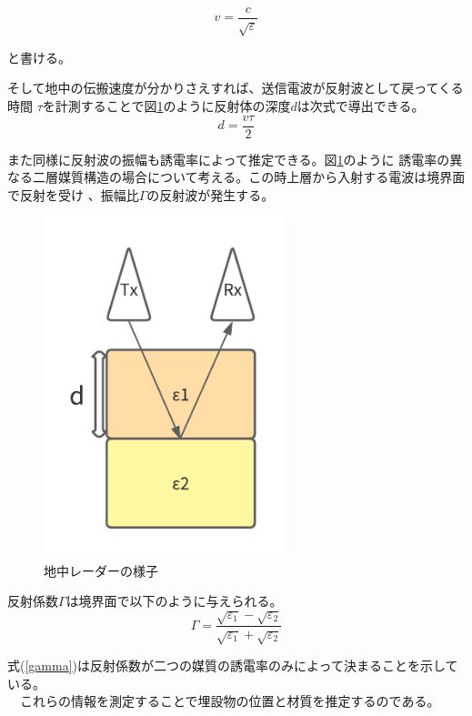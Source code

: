 \documentclass[a4paper,12pt]{jsreport}
\begin{document}
\begin{equation}
  v =
  \frac{c}{\sqrt{\varepsilon}} 
  \end{equation}

と書ける。


そして地中の伝搬速度が分かりさえすれば、送信電波が反射波として戻ってくる時間
$\tau$を計測することで図\ref{地中レーダーの様子}のように反射体の深度$d$は次式で導出できる。
\begin{equation}
  d=
  \frac{v \tau}{2} 
  \end{equation}
  
また同様に反射波の振幅も誘電率によって推定できる。図\ref{地中レーダーの様子}のように
誘電率の異なる二層媒質構造の場合について考える。この時上層から入射する電波は境界面で反射を受け
、振幅比$\Gamma$の反射波が発生する。

\begin{figure}[h]
  \begin{center}
   \includegraphics[width=7cm]{./image/radar.pdf}
   
  \caption{地中レーダーの様子}\label{地中レーダーの様子}
  \end{center}
  \end{figure}

反射係数$\Gamma$は境界面で以下のように与えられる。
\begin{equation}
  \Gamma=
  \frac{\sqrt{\varepsilon_{1}}-\sqrt{\varepsilon_{2}}}{\sqrt{\varepsilon_{1}}+\sqrt{\varepsilon_{2}}} 
\label{gamma}  
\end{equation}


式(\ref{gamma})は反射係数が二つの媒質の誘電率のみによって決まることを示している。
\\　これらの情報を測定することで埋設物の位置と材質を推定するのである。
\end{document}
